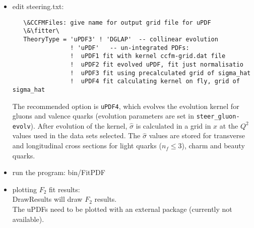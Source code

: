 \begin{itemize}
\item  edit steering.txt: 
   \begin{verbatim}
   \&CCFMFiles: give name for output grid file for uPDF   
   \&\fitter\ 
   TheoryType = 'uPDF3' ! 'DGLAP'  -- collinear evolution
                ! 'uPDF'   -- un-integrated PDFs:
                !  uPDF1 fit with kernel ccfm-grid.dat file
                !  uPDF2 fit evolved uPDF, fit just normalisatio
                !  uPDF3 fit using precalculated grid of sigma_hat
                !  uPDF4 fit calculating kernel on fly, grid of sigma_hat
  \end{verbatim}
  The recommended option is \verb+uPDF4+, which evolves the evolution kernel for gluons and valence quarks
  (evolution parameters are set in \verb+steer_gluon-evolv+). After evolution of the kernel, $\hat {\sigma}$ is
  calculated in a grid in $x$ at the  $Q^2$ values used in the data sets selected. The ${\hat \sigma}$ values are   
  stored for transverse and longitudinal cross sections for light quarks ($n_f \leq 3$), charm and beauty quarks.
\item run the program: bin/FitPDF 
   
\item plotting $F_2$ fit results: \\
DrawResults  will draw $F_2$ results. \\
The uPDFs need to be plotted with an external package (currently not available).
\end{itemize}

